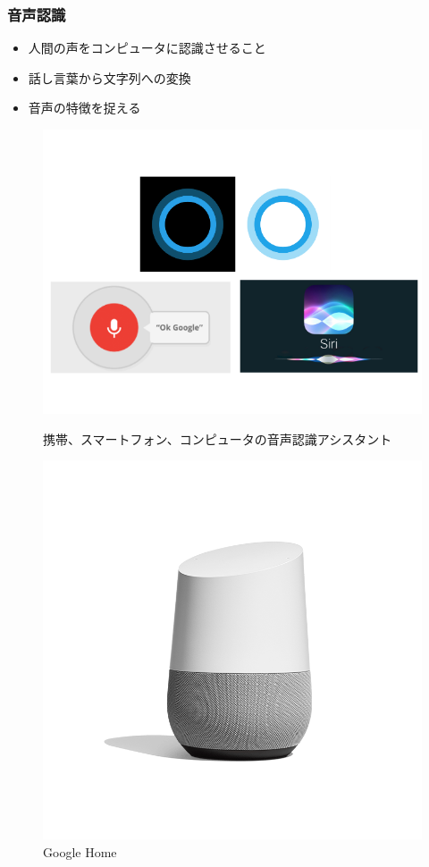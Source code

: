 \documentclass[14pt]{beamer}
\begin{document}
\begin{frame}
  \frametitle{音声認識}
  \begin{itemize}
    \item 人間の声をコンピュータに認識させること
    \item 話し言葉から文字列への変換
    \item 音声の特徴を捉える
  \end{itemize}
  \begin{figure}[tbp]
  \begin{minipage}[b]{0.45\columnwidth}
    \centering
    \includegraphics[width=\columnwidth]{voice_assistant.png}
    \caption{\scriptsize 携帯、スマートフォン、コンピュータの音声認識アシスタント}
  \end{minipage}
  \hspace{0.04\columnwidth}
  \begin{minipage}[b]{0.3\columnwidth}
    \centering
    \includegraphics[width=\columnwidth]{google_home.png}
    \caption{\scriptsize Google Home}
  \end{minipage}
\end{figure}
  

\end{frame}
\end{document}
